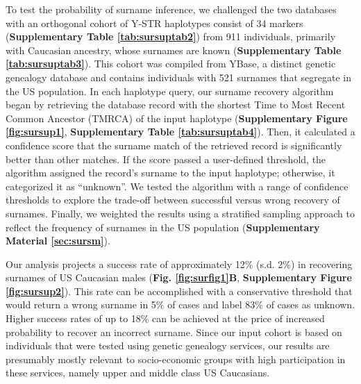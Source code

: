 To test the probability of surname inference, we challenged the two databases with an orthogonal cohort of Y-STR haplotypes consist of 34 markers (\textbf{Supplementary Table  \ref{tab:sursuptab2}}) from 911 individuals, primarily with Caucasian ancestry, whose surnames are known (\textbf{Supplementary Table  \ref{tab:sursuptab3}}). This cohort was compiled from YBase, a distinct genetic genealogy database and contains individuals with 521 surnames that segregate in the US population. In each haplotype query, our surname recovery algorithm began by retrieving the database record with the shortest Time to Most Recent Common Ancestor (TMRCA) of the input haplotype (\textbf{Supplementary Figure \ref{fig:sursup1}}, \textbf{Supplementary Table \ref{tab:sursuptab4}}). Then, it calculated a confidence score that the surname match of the retrieved record is significantly better than other matches. If the score passed a user-defined threshold, the algorithm assigned the record’s surname to the input haplotype; otherwise, it categorized it as ``unknown''. We tested the algorithm with a range of confidence thresholds to explore the trade-off between successful versus wrong recovery of surnames. Finally, we weighted the results using a stratified sampling approach to reflect the frequency of surnames in the US population (\textbf{Supplementary Material \ref{sec:sursm}}). 

Our analysis projects a success rate of approximately 12\% (s.d. 2\%) in recovering surnames of US Caucasian males (\textbf{Fig. \ref{fig:surfig1}B}, \textbf{Supplementary Figure \ref{fig:sursup2}}). This rate can be accomplished with a conservative threshold that would return a wrong surname in 5\% of cases and label 83\% of cases as unknown. Higher success rates of up to 18\% can be achieved at the price of increased probability to recover an incorrect surname. Since our input cohort is based on individuals that were tested using genetic genealogy services, our results are presumably mostly relevant to socio-economic groups with high participation in these services, namely upper and middle class US Caucasians.

